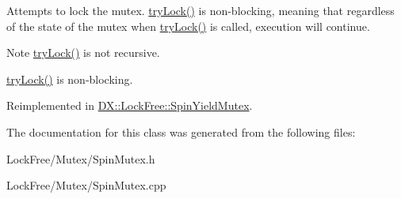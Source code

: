 Attempts to lock the mutex. \hyperlink{class_d_x_1_1_lock_free_1_1_spin_mutex_aeb3f7133cb914cafd0f7f484e6a08584}{try\-Lock()} is non-\/blocking, meaning that regardless of the state of the mutex when \hyperlink{class_d_x_1_1_lock_free_1_1_spin_mutex_aeb3f7133cb914cafd0f7f484e6a08584}{try\-Lock()} is called, execution will continue. 

\begin{DoxyNote}{Note}
\hyperlink{class_d_x_1_1_lock_free_1_1_spin_mutex_aeb3f7133cb914cafd0f7f484e6a08584}{try\-Lock()} is not recursive. 

\hyperlink{class_d_x_1_1_lock_free_1_1_spin_mutex_aeb3f7133cb914cafd0f7f484e6a08584}{try\-Lock()} is non-\/blocking. 
\end{DoxyNote}


Reimplemented in \hyperlink{class_d_x_1_1_lock_free_1_1_spin_yield_mutex_a0d8fc55d539af89d8d8e04a61bb5e887}{D\-X\-::\-Lock\-Free\-::\-Spin\-Yield\-Mutex}.



The documentation for this class was generated from the following files\-:\begin{DoxyCompactItemize}
\item 
Lock\-Free/\-Mutex/Spin\-Mutex.\-h\item 
Lock\-Free/\-Mutex/Spin\-Mutex.\-cpp\end{DoxyCompactItemize}

